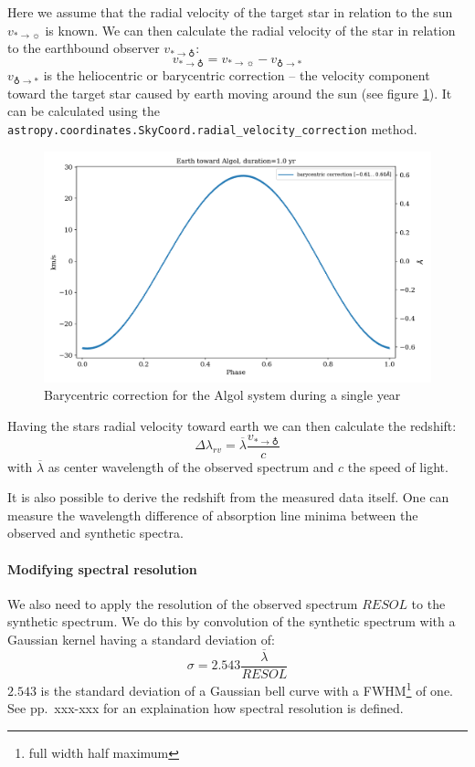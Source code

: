 \documentclass[10pt,a4paper,notitlepage,twocolumn]{article}
\begin{document}
Here we assume that the radial velocity of the target star in relation to the sun $v_{* \rightarrow \sun}$ is known.
We can then calculate the radial velocity of the star in relation to the earthbound observer $v_{* \rightarrow \earth}$:
\begin{equation}
	\label{eq:rv}
	v_{* \rightarrow \earth} = v_{* \rightarrow \sun} - v_{\earth \rightarrow *}
\end{equation}
$v_{\earth \rightarrow *}$ is the heliocentric or barycentric correction -- the velocity component toward the target star caused by earth moving around the sun (see figure \ref*{algol_bary}).
It can be calculated using the \verb|astropy.coordinates.SkyCoord.radial_velocity_correction| method.

\begin{figure}[hb]
	\label{algol_bary}
	\includegraphics[width=\columnwidth]{img/algol_bary.png}
	\caption{Barycentric correction for the Algol system during a single year}
\end{figure}

Having the stars radial velocity toward earth we can then calculate the redshift:
\begin{equation}
	\label{eq:dl}
	\Delta\lambda_{rv} = \overline{\lambda} \frac{v_{* \rightarrow \earth}}{c}
\end{equation}
with $\overline{\lambda}$ as center wavelength of the observed spectrum and $c$ the speed of light.

It is also possible to derive the redshift from the measured data itself.
One can measure the wavelength difference of absorption line minima between the observed and synthetic spectra.

\paragraph{Modifying spectral resolution}
We also need to apply the resolution of the observed spectrum $RESOL$ to the synthetic spectrum.
We do this by convolution of the synthetic spectrum with a Gaussian kernel having a standard deviation of:
\begin{equation}
	\sigma = 2.543 \frac{\overline{\lambda}}{RESOL}
\end{equation}
$2.543$ is the standard deviation of a Gaussian bell curve with a FWHM\footnote{full width half maximum} of one. See \cite{SablowskiSchanne2018} pp.\ xxx-xxx for an explaination how spectral resolution is defined.
\end{document}
